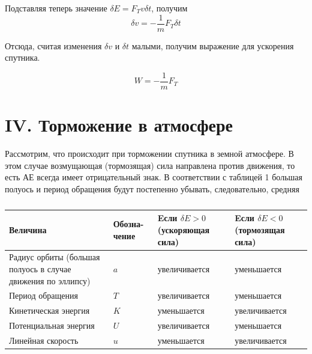 \documentclass[a4paper, 12pt]{article}
\begin{document}
\begin{multicols}{2}
Подставляя теперь значение $\delta E = F_T v \delta t$, получим
$$\delta v = -\frac{1}{m}F_T \delta t$$

Отсюда, считая изменения $\delta v$ и $\delta t$ малыми, получим выражение для ускорения спутника.

$$W = -\frac{1}{m}F_T$$

\columnbreak

\section*{\small\centering IV. Торможение в атмосфере}

Рассмотрим, что происходит при торможении спутника в земной атмосфере. В этом случае возмущающая (тормозящая) сила направлена против движения, то есть АЕ всегда имеет отрицательный знак. В соответствии с таблицей 1 большая полуось и период обращения будут постепенно убывать, следовательно, средняя

\end{multicols}

\begin{table}[!b]
	\caption{}
	\begin{tabular}{b{} | b{} | b{} | b{}}
	\hline
	Величина & Обозна- чение & Eсли $\delta E > 0$ (ускоряющая сила) & Eсли $\delta E < 0$ (тормозящая сила)\\\hline
	
	Радиус орбиты (большая полуось в случае движения по эллипсу) & $a$ & увеличивается & уменьшается\\
	
	Период обращения & $T$ & увеличивается & уменьшается\\
	
	Кинетическая энергия & $K$ & уменьшается & увеличивается\\
	
	Потенциальная энергия & $U$ & увеличивается & уменьшается\\
	
	Линейная скорость & $u$ & уменьшается & увеличивается\\ \hline
	\end{tabular}
\end{table}
\end{document}
